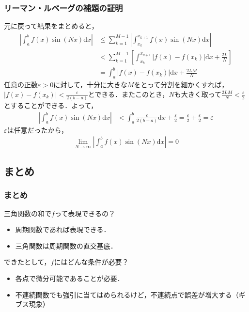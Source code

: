 \documentclass[dvipdfmx,graphicx,14pt]{beamer}
\begin{document}
\begin{frame}[c]
    \frametitle{リーマン・ルベーグの補題の証明}
    \scriptsize
    元に戻って結果をまとめると，
    \begin{align*}
        \left| \int_{a}^{b} f(x) \sin(Nx) \mathrm{d} x \right| &\leq \sum_{k=1}^{M-1} \left| \int_{x_{k}}^{x_{k+1}} f(x) \sin(Nx) \mathrm{d} x \right| \\
        &< \sum_{k=1}^{M-1} \left[ \int_{x_{k}}^{x_{k+1}} | f(x) - f(x_{k}) | \mathrm{d} x +  \frac{2L}{N} \right] \\
        &= \int_{a}^{b} | f(x) - f(x_{k}) | \mathrm{d} x + \frac{2LM}{N}
    \end{align*}
    任意の正数$\varepsilon > 0$に対して，十分に大きな$M$をとって分割を細かくすれば，$| f(x) - f(x_{k}) | < \frac{\varepsilon}{2(b-a)}$とできる．またこのとき，$N$も大きく取って$\frac{2LM}{N} < \frac{\varepsilon}{2}$とすることができる．よって，
    \begin{align*}
        \left| \int_{a}^{b} f(x) \sin(Nx) \mathrm{d} x \right| &< \int_{a}^{b} \frac{\varepsilon}{2(b-a)} \mathrm{d} x + \frac{\varepsilon}{2} = \frac{\varepsilon}{2} + \frac{\varepsilon}{2} = \varepsilon
    \end{align*}
    $\varepsilon$は任意だったから，
    \begin{align*}
        \lim_{N\to\infty} \left| \int_{a}^{b} f(x) \sin(Nx) \mathrm{d} x \right| = 0
    \end{align*}
\end{frame}

\subsection{まとめ}

\begin{frame}[c]
    \frametitle{まとめ}
    三角関数の和で$f$って表現できるの？
    \begin{itemize}
        \item 周期関数であれば表現できる．
        \item 三角関数は周期関数の直交基底．
    \end{itemize}
    できたとして，$f$にはどんな条件が必要？
    \begin{itemize}
        \item 各点で微分可能であることが必要．
        \item 不連続関数でも強引に当てはめられるけど，不連続点で誤差が増大する（ギブス現象）
    \end{itemize}
\end{frame}
\end{document}
